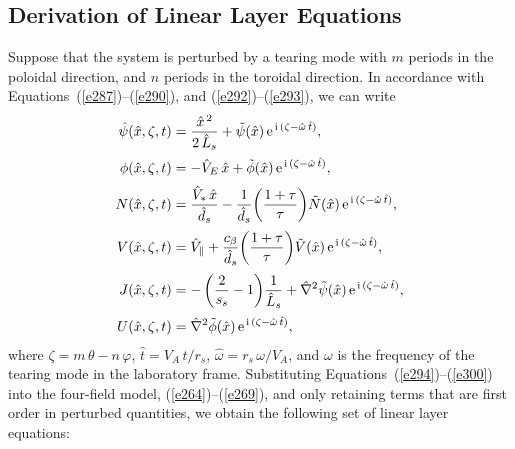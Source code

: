 \documentclass[notitlepage,12pt]{article}
\begin{document}
\subsection{Derivation of Linear Layer Equations}\label{s5.3}
Suppose that the system is perturbed by a tearing mode with $m$ periods in the poloidal direction, and
$n$ periods in the toroidal direction. In accordance with Equations~(\ref{e287})--(\ref{e290}), and (\ref{e292})--(\ref{e293}), we can write
\begin{align}
\hat{\psi}(\hat{x},\zeta,t) &= \frac{\hat{x}^{\,2} }{2\,\hat{L}_s}+ \tilde{\psi}(\hat{x})\,{\rm e}^{\,{\rm i}\,(\zeta-\hat{\omega}\,\hat{t})},\\[0.5ex]
\phi(\hat{x},\zeta,t) &=-\hat{V}_E\,\hat{x}+ \tilde{\phi}(\hat{x})\,{\rm e}^{\,{\rm i}\,(\zeta-\hat{\omega}\,\hat{t})},\\[0.5ex]
N(\hat{x},\zeta,t) &= \frac{\hat{V}_\ast\,\hat{x}}{\hat{d}_s}-\frac{1}{\hat{d}_s}\!\left(\frac{1+\tau}{\tau}\right)\!\tilde{N}(\hat{x})\,{\rm e}^{\,{\rm i}\,(\zeta-\hat{\omega}\,\hat{t})},\\[0.5ex]
V(\hat{x},\zeta,t) &= \hat{V}_\parallel + \frac{c_\beta}{\hat{d}_s}\!\left(\frac{1+\tau}{\tau}\right)\!\tilde{V}(\hat{x})\,{\rm e}^{\,{\rm i}\,(\zeta-\hat{\omega}\,\hat{t})},\\[0.5ex]
J(\hat{x},\zeta,t) &=-\left(\frac{2}{s_s}-1\right)\!\frac{1}{\hat{L}_s}+ \hat{\nabla}^2\tilde{\psi}(\hat{x})\,{\rm e}^{\,{\rm i}\,(\zeta-\hat{\omega}\,\hat{t})},\\[0.5ex]
U(\hat{x},\zeta,t) &=  \hat{\nabla}^2\tilde{\phi}(\hat{x})\,{\rm e}^{\,{\rm i}\,(\zeta-\hat{\omega}\,\hat{t})},\label{e300}
\end{align}
where $\zeta=m\,\theta-n\,\varphi$, $\hat{t}=V_A\,t/r_s$, $\hat{\omega}=r_s\,\omega/V_A$, and $\omega$ is the frequency of the tearing mode in the laboratory frame. 
Substituting Equations~(\ref{e294})--(\ref{e300}) into the four-field model, (\ref{e264})--(\ref{e269}), and only retaining terms that
are first order in perturbed quantities, we obtain the following set of linear layer equations:
\end{document}
